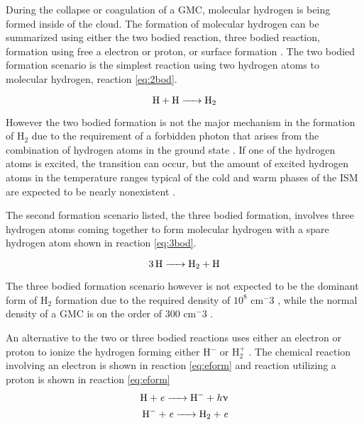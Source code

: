 During the collapse or coagulation of a GMC, molecular hydrogen is being formed inside of the cloud.  The formation of molecular hydrogen can be summarized using either the two bodied reaction, three bodied reaction, formation using free a electron or proton, or surface formation \citep{krumholz2014}.  The two bodied formation scenario is the simplest reaction using two hydrogen atoms to molecular hydrogen, reaction \ref{eq:2bod}.

\begin{equation}\label{eq:2bod}
  \ce{H + H -> H_2}
\end{equation}

However the two bodied formation is not the major mechanism in the formation of H$_2$ due to the requirement of a forbidden photon that arises from the combination of hydrogen atoms in the ground state \citep{gould1963}.  If one of the hydrogen atoms is excited, the transition can occur, but the amount of excited hydrogen atoms in the temperature ranges typical of the cold and warm phases of the ISM are expected to be nearly nonexistent \citep{krumholz2014}.

The second formation scenario listed, the three bodied formation, involves three hydrogen atoms coming together to form molecular hydrogen with a spare hydrogen atom shown in reaction \ref{eq:3bod}.

\begin{equation}\label{eq:3bod}
  \ce{3H -> H_2 + H}
\end{equation}

The three bodied formation scenario however is not expected to be the dominant form of H$_2$ formation due to the required density of $10^8$ cm$^-3$ \citep{palla1983,abel1997}, while the normal density of a GMC is on the order of 300 cm$^-3$ \citep{krumholz2014}.

An alternative to the two or three bodied reactions uses either an electron or proton to ionize the hydrogen forming either H$^-$ or H$_2^+$ \citep{krumholz2014}.  The chemical reaction involving an electron is shown in reaction \ref{eq:eform} and reaction utilizing a proton is shown in reaction \ref{eq:eform}
\begin{equation}\label{eq:eform}
  \begin{split}
    \ce{H + \it{e} -> H^- + \it{h\nu}} \\
    \ce{H^- + \it{e} -> H_2 + \it{e}}
  \end{split}
\end{equation}

